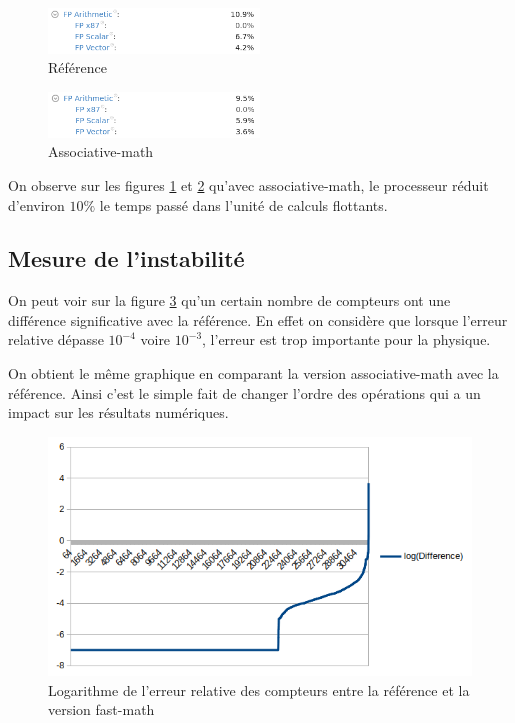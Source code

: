 \documentclass[a4paper]{report}
\begin{document}
\begin{figure}[!htb]
    \includegraphics[width=0.5\textwidth, center]{reference_vtune.png}
    \caption{Référence}
    \label{reference_vtune}
\end{figure}

\begin{figure}[!htb]
    \includegraphics[width=0.5\textwidth, center]{associative-math_vtune.png}
    \caption{Associative-math}
    \label{associative-math_vtune}
\end{figure}

On observe sur les figures \ref{reference_vtune} et \ref{associative-math_vtune} qu'avec associative-math, le processeur réduit d'environ $10\%$ le temps passé dans l'unité de calculs flottants.

\subsection{Mesure de l'instabilité}
On peut voir sur la figure \ref{fast-math_difference} qu'un certain nombre de compteurs ont une différence significative avec la référence.
En effet on considère que lorsque l'erreur relative dépasse $10^{-4}$ voire $10^{-3}$, l'erreur est trop importante pour la physique.

On obtient le même graphique en comparant la version associative-math avec la référence.
Ainsi c'est le simple fait de changer l'ordre des opérations qui a un impact sur les résultats numériques.

\begin{figure}[!htb]
    \includegraphics[width=\textwidth, center]{fast-math_difference.png}
    \caption{Logarithme de l'erreur relative des compteurs entre la référence et la version fast-math}
    \label{fast-math_difference}
\end{figure}
\end{document}
